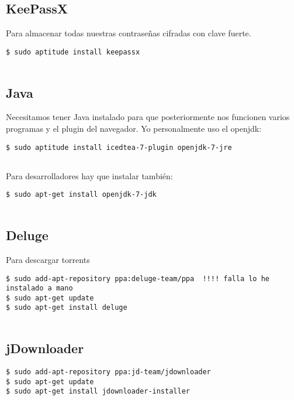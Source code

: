 \subsection{KeePassX}\label{keepassx}

Para almacenar todas nuestras contraseñas cifradas con clave fuerte.

\begin{verbatim}
$ sudo aptitude install keepassx
      
\end{verbatim}

\subsection{Java}\label{java}

Necesitamos tener Java instalado para que posteriormente nos funcionen
varios programas y el plugin del navegador. Yo personalmente uso el
openjdk:

\begin{verbatim}
$ sudo aptitude install icedtea-7-plugin openjdk-7-jre
      
\end{verbatim}

Para desarrolladores hay que instalar también:

\begin{verbatim}
$ sudo apt-get install openjdk-7-jdk
      
\end{verbatim}

\subsection{Deluge}\label{deluge}

Para descargar torrents

\begin{verbatim}
$ sudo add-apt-repository ppa:deluge-team/ppa  !!!! falla lo he instalado a mano
$ sudo apt-get update
$ sudo apt-get install deluge
      
\end{verbatim}

\subsection{jDownloader}\label{jdownloader}

\begin{verbatim}
$ sudo add-apt-repository ppa:jd-team/jdownloader
$ sudo apt-get update
$ sudo apt-get install jdownloader-installer
      
\end{verbatim}

